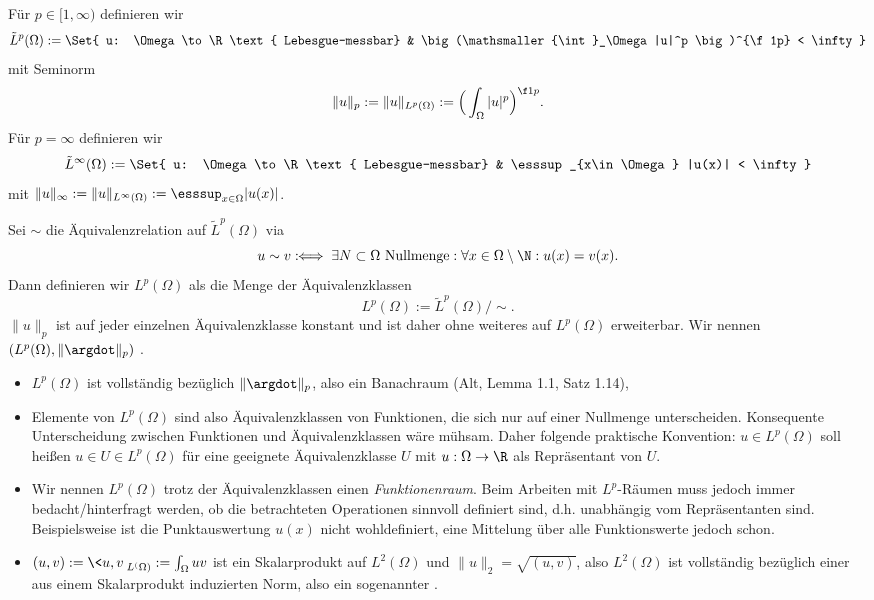 \begin{df}[$L^p$-Räume] \label{1.4}
	Für $p \in [1, \infty)$ definieren wir
	\[
		\tilde L^p(\Omega) := \Set{ u: \Omega \to \R \text{ Lebesgue-messbar} & \big(\mathsmaller{\int}_\Omega |u|^p \big)^{\f 1p} < \infty}
	\]
	mit Seminorm
	\[
		\|u\|_p := \|u\|_{L^p(\Omega)}  := \Big(\int_\Omega |u|^p \Big)^{\f 1p}.
	\]
	Für $p = \infty$ definieren wir
	\[
		\tilde L^\infty(\Omega) := \Set{ u: \Omega \to \R \text{ Lebesgue-messbar} & \esssup_{x\in \Omega} |u(x)| < \infty }
	\]
	mit $\|u\|_\infty := \|u\|_{L^\infty(\Omega)} := \esssup_{x\in \Omega} |u(x)|$.

	Sei $\sim$ die Äquivalenzrelation auf $\tilde L^p(\Omega)$ via
	\[
		u \sim v \defiff \exists N \subset \Omega \text{ Nullmenge} : \forall x \in \Omega \setminus \N : u(x) = v(x).
	\]
	Dann definieren wir $L^p(\Omega)$ als die Menge der Äquivalenzklassen
	\[
		L^p(\Omega) := \tilde L^p(\Omega) / \sim.
	\]
	$\|u\|_p$ ist auf jeder einzelnen Äquivalenzklasse konstant und ist daher ohne weiteres auf $L^p(\Omega)$ erweiterbar.
	Wir nennen $(L^p(\Omega), \|\argdot\|_p)$ .
	\begin{note}
		\begin{itemize}
			\item
				$L^p(\Omega)$ ist vollständig bezüglich $\|\argdot\|_p$, also ein Banachraum (Alt, Lemma 1.1, Satz 1.14),
			\item
				Elemente von $L^p(\Omega)$ sind also Äquivalenzklassen von Funktionen, die sich nur auf einer Nullmenge unterscheiden.
				Konsequente Unterscheidung zwischen Funktionen und Äquivalenzklassen wäre mühsam.
				Daher folgende praktische Konvention: $u \in L^p(\Omega)$ soll heißen $u \in U \in L^p(\Omega)$ für eine geeignete Äquivalenzklasse $U$ mit $u: \Omega \to \R$ als Repräsentant von $U$.
			\item
				Wir nennen $L^p(\Omega)$ trotz der Äquivalenzklassen einen \emph{Funktionenraum}.
				Beim Arbeiten mit $L^p$-Räumen muss jedoch immer bedacht/hinterfragt werden, ob die betrachteten Operationen sinnvoll definiert sind, d.h. unabhängig vom Repräsentanten sind.
				Beispielsweise ist die Punktauswertung $u(x)$ nicht wohldefiniert, eine Mittelung über alle Funktionswerte jedoch schon.
			\item
				$(u,v) := \<u,v\>_{L^(\Omega)} := \int_\Omega uv$ ist ein Skalarprodukt auf $L^2(\Omega)$ und $\|u\|_2 = \sqrt{(u,v)}$, also $L^2(\Omega)$ ist vollständig bezüglich einer aus einem Skalarprodukt induzierten Norm, also ein sogenannter .

\end{itemize}
\end{note}
\end{df}
